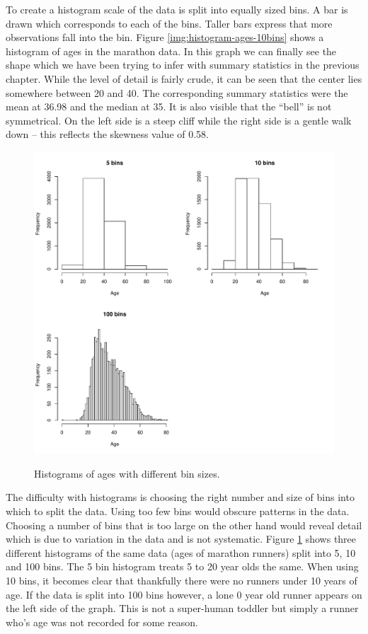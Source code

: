 \documentclass{tufte-book} %
\begin{document}
To create a histogram scale of the data is split into equally sized bins. A bar is drawn which corresponds to each of the bins. Taller bars express that more observations fall into the bin. Figure \ref{img:histogram-ages-10bins} shows a histogram of ages in the marathon data. In this graph we can finally see the shape which we have been trying to infer with summary statistics in the previous chapter. While the level of detail is fairly crude, it can be seen that the center lies somewhere between 20 and 40. The corresponding summary statistics were the mean at 36.98 and the median at 35. It is also visible that the ``bell'' is not symmetrical. On the left side is a steep cliff while the right side is a gentle walk down -- this reflects the skewness value of 0.58.

\begin{figure}
	\centering
	\includegraphics{graphics/histogram-ages-allbins}
	\label{img:histogram-ages-allbins}
	\caption{Histograms of ages with different bin sizes.}
\end{figure}

The difficulty with histograms is choosing the right number and size of bins into which to split the data. Using too few bins would obscure patterns in the data. Choosing a number of bins that is too large on the other hand would reveal detail which is due to variation in the data and is not systematic. Figure \ref{img:histogram-ages-allbins} shows three different histograms of the same data (ages of marathon runners) split into 5, 10 and 100 bins. The 5 bin histogram treats 5 to 20 year olds the same. When using 10 bins, it becomes clear that thankfully there were no runners under 10 years of age. If the data is split into 100 bins however, a lone 0 year old runner appears on the left side of the graph. This is not a super-human toddler but simply a runner who's age was not recorded for some reason.
\end{document}
